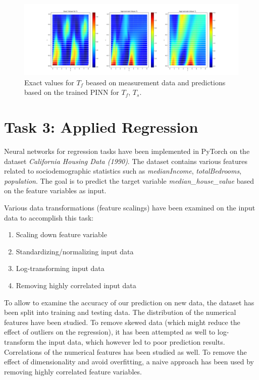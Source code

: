 \documentclass[letterpaper,12pt]{article}
\begin{document}
\begin{figure}[!htb]
    \centering
    \includegraphics[width=.9\textwidth]{Graphics/Task2_Exact_Approximate_Solution.png}
    \caption{Exact values for $T_f$ beased on measurement data and predictions based on the trained PINN for $T_f$,  $T_s$.}
\end{figure}
\FloatBarrier




\section*{Task 3: Applied Regression}
Neural networks for regression tasks have been implemented in PyTorch on the dataset \textit{California Housing Data (1990)}. The dataset contains various features related to sociodemographic statistics such as \textit{medianIncome}, \textit{totalBedrooms}, \textit{population}. The goal is to predict the target variable \textit{median\_house\_value} based on the feature variables as input.

Various data transformations (feature scalings) have been examined on the input data to accomplish this task:
\begin{enumerate}
	\setlength\itemsep{-0.2em}
	\item Scaling down feature variable
  	\item Standardizing/normalizing input data
	\item Log-transforming input data
	\item Removing highly correlated input data
\end{enumerate}
To allow to examine the accuracy of our prediction on new data, the dataset has been split into training and testing data. The distribution of the numerical features have been studied. To remove skewed data (which might reduce the effect of outliers on the regression), it has been attempted as well
to log-transform the input data, which however led to poor prediction results. Correlations of the numerical features has been studied as well. To remove the effect of dimensionality and avoid overfitting, a naive approach has been used by removing highly correlated feature variables.
\end{document}
